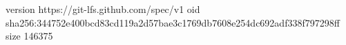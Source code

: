 version https://git-lfs.github.com/spec/v1
oid sha256:344752e400bcd83cd119a2d57bae3c1769db7608e254dc692adf338f797298ff
size 146375
